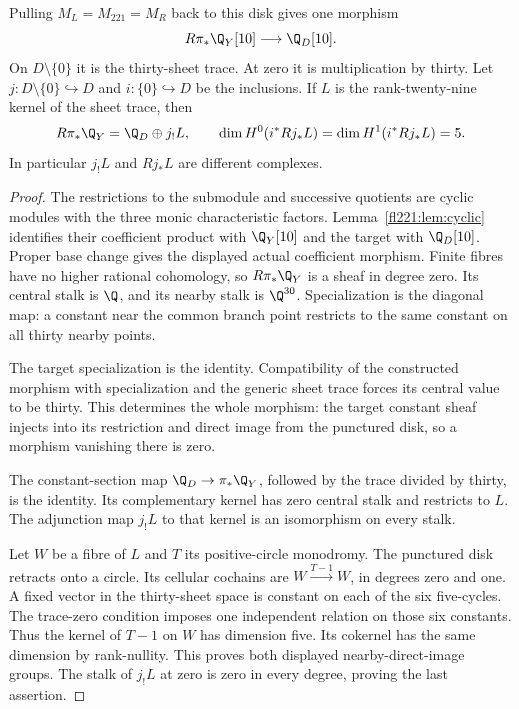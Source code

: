 \begin{proposition}
\label{fl221:prop:gluing}
Pulling $M_L=M_{221}=M_R$ back to this disk gives one morphism
\[
                   R\pi_*\Q_Y[10]\longrightarrow\Q_D[10].
\]
On $D\setminus\{0\}$ it is the thirty-sheet trace. At zero it is
multiplication by thirty. Let $j:D\setminus\{0\}\hookrightarrow D$
and $i:\{0\}\hookrightarrow D$ be the inclusions.
If $L$ is the rank-twenty-nine kernel of the sheet trace, then
\[
 R\pi_*\Q_Y=\Q_D\oplus j_!L,
 \qquad
 \dim H^0(i^*Rj_*L)=\dim H^1(i^*Rj_*L)=5.
\]
In particular $j_!L$ and $Rj_*L$ are different complexes.
\end{proposition}

\begin{proof}
The restrictions to the submodule and successive quotients are
cyclic modules with the three monic characteristic factors.
Lemma~\ref{fl221:lem:cyclic} identifies their coefficient product
with $\Q_Y[10]$ and the target with $\Q_D[10]$.
Proper base change gives the displayed actual coefficient morphism.
Finite fibres have no higher rational cohomology, so $R\pi_*\Q_Y$
is a sheaf in degree zero. Its central stalk is $\Q$, and its
nearby stalk is $\Q^{30}$. Specialization is the diagonal map:
a constant near the common branch point restricts to the same
constant on all thirty nearby points.

The target specialization is the identity. Compatibility of the
constructed morphism with specialization and the generic sheet
trace forces its central value to be thirty. This determines the
whole morphism: the target constant sheaf injects into its restriction
and direct image from the punctured disk, so a morphism vanishing
there is zero.

The constant-section map $\Q_D\to\pi_*\Q_Y$, followed by the
trace divided by thirty, is the identity. Its complementary kernel
has zero central stalk and restricts to $L$. The adjunction map
$j_!L$ to that kernel is an isomorphism on every stalk.

Let $W$ be a fibre of $L$ and $T$ its positive-circle monodromy.
The punctured disk retracts onto a circle. Its cellular cochains
are $W\xrightarrow{T-1}W$, in degrees zero and one.
A fixed vector in the thirty-sheet space is constant on each of
the six five-cycles. The trace-zero condition imposes one independent
relation on those six constants. Thus the kernel of $T-1$ on $W$
has dimension five. Its cokernel has the same dimension by
rank-nullity. This proves both displayed nearby-direct-image groups.
The stalk of $j_!L$ at zero is zero in every degree, proving the
last assertion.
\end{proof}


